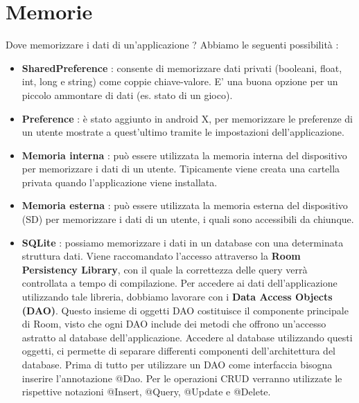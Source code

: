 \documentclass[12pt]{report}
\begin{document}
\chapter{Memorie}
Dove memorizzare i dati di un'applicazione ? Abbiamo le seguenti possibilità :
\begin{itemize}
\item \textbf{SharedPreference} : consente di memorizzare dati privati (booleani, float, int, long e string) come coppie chiave-valore. E' una buona opzione per un piccolo ammontare di dati (es. stato di un gioco).
\item \textbf{Preference} : è stato aggiunto in android X, per memorizzare le preferenze di un utente mostrate a quest'ultimo tramite le impostazioni dell'applicazione.
\item \textbf{Memoria interna} : può essere utilizzata la memoria interna del dispositivo per memorizzare i dati di un utente. Tipicamente viene creata una cartella privata quando l'applicazione viene installata.
\item \textbf{Memoria esterna} : può essere utilizzata la memoria esterna del dispositivo (SD) per memorizzare i dati di un utente, i quali sono accessibili da chiunque.
\item \textbf{SQLite} : possiamo memorizzare i dati in un database con una determinata struttura dati. Viene raccomandato l'accesso attraverso la \textbf{Room Persistency Library}, con il quale la correttezza delle query verrà controllata a tempo di compilazione. Per accedere ai dati dell'applicazione utilizzando tale libreria, dobbiamo lavorare con i \textbf{Data Access Objects (DAO)}. Questo insieme di oggetti DAO costituisce il componente principale di Room, visto che ogni DAO include dei metodi che offrono un'accesso astratto al database dell'applicazione. Accedere al database utilizzando questi oggetti, ci permette di separare differenti componenti dell'architettura del database. Prima di tutto per utilizzare un DAO come interfaccia bisogna inserire l'annotazione @Dao. Per le operazioni CRUD verranno utilizzate le rispettive notazioni @Insert, @Query, @Update e @Delete.

\end{itemize}
\end{document}
